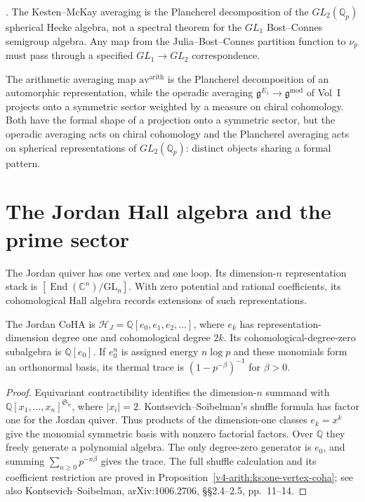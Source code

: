 \begin{corollary}
\label{v4-arith:cor:kesten-mckay-is-local-hecke}
\ClaimStatusProvedHere. The Kesten--McKay averaging is the
Plancherel decomposition of the \(GL_{2}(\mathbb{Q}_{p})\) spherical
Hecke algebra, not a spectral theorem for the \(GL_{1}\) Bost--Connes
semigroup algebra. Any map from the Julia--Bost--Connes partition
function to \(\nu_{p}\) must pass through a specified \(GL_{1}\to GL_{2}\)
correspondence.
\end{corollary}

\begin{remark}
\label{v4-arith:rem:arithmetic-averaging-plancherel}
The arithmetic averaging map \(\mathrm{av}^{\mathrm{arith}}\) is the
Plancherel decomposition of an automorphic representation, while the
operadic averaging \(\mathfrak{g}^{E_{1}}\to\mathfrak{g}^{\mathrm{mod}}\)
of Vol~I projects onto a symmetric sector weighted by a measure on
chiral cohomology. Both have the formal shape of a projection onto a
symmetric sector, but the operadic averaging acts on chiral cohomology
and the Plancherel averaging acts on spherical representations of
\(GL_2(\mathbb{Q}_p)\): distinct objects sharing a formal pattern.
\end{remark}

\section{The Jordan Hall algebra and the prime sector}
\label{v4-arith:cs:soibelman-coha}

The Jordan quiver has one vertex and one loop. Its dimension-$n$
representation stack is $[\operatorname{End}(\mathbb C^n)/\mathrm{GL}_n]$.
With zero potential and rational coefficients, its cohomological Hall
algebra records extensions of such representations.

\begin{proposition}
\label{v4-arith:thm:KS-CoHA-adelic}
\ClaimStatusProvedHere{}
The Jordan CoHA is
$\mathcal H_J=\mathbb Q[e_0,e_1,e_2,\ldots]$, where $e_k$ has
representation-dimension degree one and cohomological degree $2k$.
Its cohomological-degree-zero subalgebra is $\mathbb Q[e_0]$.
If $e_0^n$ is assigned energy $n\log p$ and these monomials form an
orthonormal basis, its thermal trace is $(1-p^{-\beta})^{-1}$ for
$\beta>0$.
\end{proposition}

\begin{proof}
Equivariant contractibility identifies the dimension-$n$ summand
with $\mathbb Q[x_1,\ldots,x_n]^{\mathfrak S_n}$, where $|x_i|=2$.
Kontsevich--Soibelman's shuffle formula has factor one for the
Jordan quiver. Thus products of the dimension-one classes $e_k=x^k$
give the monomial symmetric basis with nonzero factorial factors.
Over $\mathbb Q$ they freely generate a polynomial algebra.
The only degree-zero generator is $e_0$, and summing
$\sum_{n\geq0}p^{-n\beta}$ gives the trace.
The full shuffle calculation and its coefficient restriction are
proved in Proposition~\ref{v4-arith:ks:one-vertex-coha}; see also
Kontsevich--Soibelman, arXiv:1006.2706, \S\S2.4--2.5, pp.~11--14.
\end{proof}

